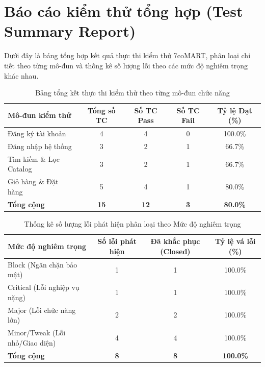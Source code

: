 \section{Báo cáo kiểm thử tổng hợp (Test Summary Report)}
Dưới đây là bảng tổng hợp kết quả thực thi kiểm thử 7coMART, phân loại chi tiết theo từng mô-đun và thống kê số lượng lỗi theo các mức độ nghiêm trọng khác nhau.

\begin{table}[H]
\centering
\caption{Bảng tổng kết thực thi kiểm thử theo từng mô-đun chức năng}
\renewcommand{\arraystretch}{1.2}
\begin{tabular}{|l|c|c|c|c|}
\hline
\textbf{Mô-đun kiểm thử} & \textbf{Tổng số TC} & \textbf{Số TC Pass} & \textbf{Số TC Fail} & \textbf{Tỷ lệ Đạt (\%)} \\ \hline
Đăng ký tài khoản & 4 & 4 & 0 & 100.0\% \\ \hline
Đăng nhập hệ thống & 3 & 2 & 1 & 66.7\% \\ \hline
Tìm kiếm \& Lọc Catalog & 3 & 2 & 1 & 66.7\% \\ \hline
Giỏ hàng \& Đặt hàng & 5 & 4 & 1 & 80.0\% \\ \hline
\textbf{Tổng cộng} & \textbf{15} & \textbf{12} & \textbf{3} & \textbf{80.0\%} \\ \hline
\end{tabular}
\end{table}

\begin{table}[H]
\centering
\caption{Thống kê số lượng lỗi phát hiện phân loại theo Mức độ nghiêm trọng}
\renewcommand{\arraystretch}{1.2}
\begin{tabular}{|l|c|c|c|}
\hline
\textbf{Mức độ nghiêm trọng} & \textbf{Số lỗi phát hiện} & \textbf{Đã khắc phục (Closed)} & \textbf{Tỷ lệ vá lỗi (\%)} \\ \hline
Block (Ngăn chặn bảo mật) & 1 & 1 & 100.0\% \\ \hline
Critical (Lỗi nghiệp vụ nặng) & 1 & 1 & 100.0\% \\ \hline
Major (Lỗi chức năng lớn) & 2 & 2 & 100.0\% \\ \hline
Minor/Tweak (Lỗi nhỏ/Giao diện) & 4 & 4 & 100.0\% \\ \hline
\textbf{Tổng cộng} & \textbf{8} & \textbf{8} & \textbf{100.0\%} \\ \hline
\end{tabular}
\end{table}

